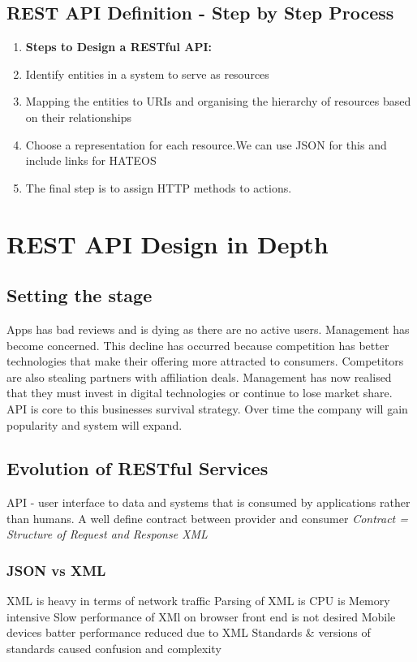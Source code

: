 \subsection{REST API Definition - Step by Step Process}
\begin{enumerate}
    \item[] \textbf{Steps to Design a RESTful API:}
    \item Identify entities in a system to serve as resources
    \item Mapping the entities to URIs and organising the hierarchy of resources based on their relationships
    \item Choose a representation for each resource.We can use JSON for this and include links for HATEOS
    \item The final step is to assign HTTP methods to actions.
\end{enumerate}


\section{REST API Design in Depth}

\subsection{Setting the stage}
Apps has bad reviews and is dying as there are no active users.
Management has become concerned.
This decline has occurred because competition has better technologies that make their offering more attracted to consumers.
Competitors are also stealing partners with affiliation deals.
Management has now realised that they must invest in digital technologies or continue to lose market share.
API is core to this businesses survival strategy.
Over time the company will gain popularity and system will expand.

\subsection{Evolution of RESTful Services}
API - user interface to data and systems that is consumed by applications rather than humans.
A well define contract between provider and consumer
\textit{Contract = Structure of Request and Response XML}

\subsubsection{JSON vs XML}
XML is heavy in terms of network traffic
Parsing of XML is CPU is Memory intensive
Slow performance of XMl on browser front end is not desired
Mobile devices batter performance reduced due to XML
Standards \& versions of standards caused confusion and complexity

